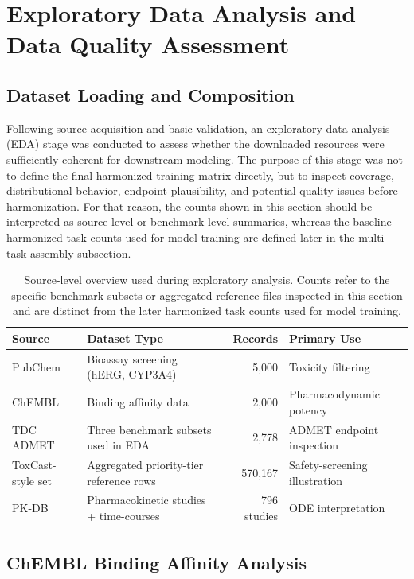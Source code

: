 \documentclass[a4paper,11pt,twoside]{report}
\begin{document}
\section{Exploratory Data Analysis and Data Quality Assessment}

\subsection{Dataset Loading and Composition}

Following source acquisition and basic validation, an exploratory data analysis (EDA) stage was conducted to assess whether the downloaded resources were sufficiently coherent for downstream modeling. The purpose of this stage was not to define the final harmonized training matrix directly, but to inspect coverage, distributional behavior, endpoint plausibility, and potential quality issues before harmonization. For that reason, the counts shown in this section should be interpreted as source-level or benchmark-level summaries, whereas the baseline harmonized task counts used for model training are defined later in the multi-task assembly subsection.

\begin{table}[htbp]
\centering
\small
\caption{Source-level overview used during exploratory analysis. Counts refer to the specific benchmark subsets or aggregated reference files inspected in this section and are distinct from the later harmonized task counts used for model training.}
\label{tab:eda_summary}
\begin{tabular}{p{2.2cm}|p{3.5cm}|r|p{3.0cm}}
\hline
\textbf{Source} & \textbf{Dataset Type} & \textbf{Records} & \textbf{Primary Use} \\
\hline
PubChem & Bioassay screening (hERG, CYP3A4) & 5,000 & Toxicity filtering \\
ChEMBL & Binding affinity data & 2,000 & Pharmacodynamic potency \\
TDC ADMET & Three benchmark subsets used in EDA & 2,778 & ADMET endpoint inspection \\
ToxCast-style set & Aggregated priority-tier reference rows & 570,167 & Safety-screening illustration \\
PK-DB & Pharmacokinetic studies + time-courses & 796 studies & ODE interpretation \\
\hline
\end{tabular}
\end{table}

\subsection{ChEMBL Binding Affinity Analysis}
\end{document}
